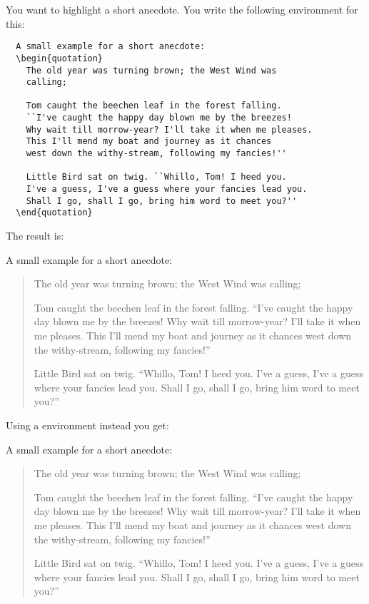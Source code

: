 \begin{Example}
  You want to highlight a short anecdote. You write the following
   environment for this:
\begin{lstlisting}
  A small example for a short anecdote:
  \begin{quotation}
    The old year was turning brown; the West Wind was
    calling;
        
    Tom caught the beechen leaf in the forest falling.
    ``I've caught the happy day blown me by the breezes!
    Why wait till morrow-year? I'll take it when me pleases.
    This I'll mend my boat and journey as it chances
    west down the withy-stream, following my fancies!''
    
    Little Bird sat on twig. ``Whillo, Tom! I heed you.
    I've a guess, I've a guess where your fancies lead you.
    Shall I go, shall I go, bring him word to meet you?''
  \end{quotation}
\end{lstlisting}
  The result is:
  \begin{ShowOutput}
    A small example for a short anecdote:
    \begin{quotation}
    The old year was turning brown; the West Wind was
    calling;
    
    Tom caught the beechen leaf in the forest falling.
    ``I've caught the happy day blown me by the breezes!
    Why wait till morrow-year? I'll take it when me pleases.
    This I'll mend my boat and journey as it chances
    west down the withy-stream, following my fancies!''
    
    Little Bird sat on twig. ``Whillo, Tom! I heed you.
    I've a guess, I've a guess where your fancies lead you.
    Shall I go, shall I go, bring him word to meet you?''
    \end{quotation}
  \end{ShowOutput}
  Using a  environment instead you get:
  \begin{ShowOutput}
    A small example for a short anecdote:
     \begin{quote}\setlength{\parskip}{4pt plus 2pt minus 2pt}
    The old year was turning brown; the West Wind was
    calling;

    Tom caught the beechen leaf in the forest falling.
    ``I've caught the happy day blown me by the breezes!
    Why wait till morrow-year? I'll take it when me pleases.
    This I'll mend my boat and journey as it chances
    west down the withy-stream, following my fancies!''
    
    Little Bird sat on twig. ``Whillo, Tom! I heed you.
    I've a guess, I've a guess where your fancies lead you.
    Shall I go, shall I go, bring him word to meet you?''
    \end{quote}
  \end{ShowOutput}
\end{Example}
%
%
%



